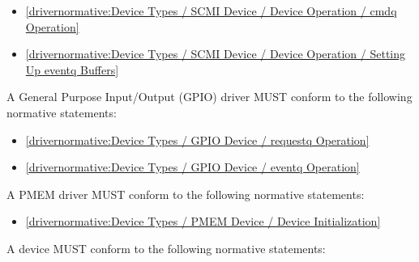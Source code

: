 \begin{itemize}
\item \ref{drivernormative:Device Types / SCMI Device / Device Operation / cmdq Operation}
\item \ref{drivernormative:Device Types / SCMI Device / Device Operation / Setting Up eventq Buffers}
\end{itemize}

\label{sec:Conformance / Driver Conformance / GPIO Driver Conformance}

A General Purpose Input/Output (GPIO) driver MUST conform to the following
normative statements:

\begin{itemize}
\item \ref{drivernormative:Device Types / GPIO Device / requestq Operation}
\item \ref{drivernormative:Device Types / GPIO Device / eventq Operation}
\end{itemize}

\label{sec:Conformance / Driver Conformance / PMEM Driver Conformance}

A PMEM driver MUST conform to the following normative statements:

\begin{itemize}
\item \ref{drivernormative:Device Types / PMEM Device / Device Initialization}
\end{itemize}

\label{sec:Conformance / Device Conformance}

A device MUST conform to the following normative statements:


